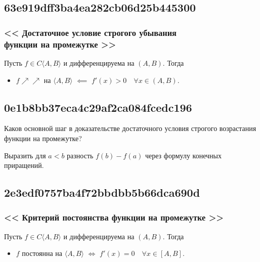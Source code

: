 \documentclass[11pt, a5paper]{article}
\newenvironment{note}[1]{\goodbreak\par\subsection{\hfill \color{lightgray}\tiny #1}}{}
\newenvironment{cloze}[2][\ldots]{\begin{leftbar}}{\end{leftbar}}
\newenvironment{icloze}[2][\ldots]{%
  \ignorespaces\text{\tiny \color{lightgray}\{#2} %
}{%
  \text{\tiny\color{lightgray}\}}\unskip%
}
\begin{document}
\begin{note}{63e919dff3ba4ea282cb06d25b445300}
    \subsubsection{<<\begin{icloze}{5}Достаточное условие строгого убывания \\ \phantom{<<}функции на промежутке\end{icloze}>>}
    Пусть \begin{icloze}{4}\( f \in C\langle A, B \rangle  \) и дифференцируема на \( (A, B) \).\end{icloze} Тогда
    \begin{itemize}
        \item {}\begin{icloze}{2}\( f \!\nearrow\!\!\nearrow \) на \( \langle A, B \rangle  \)\end{icloze}
            \begin{icloze}{3}\( \impliedby  \)\end{icloze}
            \begin{icloze}{1}\( f'(x) > 0 \quad \forall x \in (A, B) \).\end{icloze}
    \end{itemize}
\end{note}

\begin{note}{0e1b8bb37eca4c29af2ca084fcedc196}
    Каков основной шаг в доказательстве достаточного условия строгого возрастания функции на промежутке?

    \begin{cloze}{1}
        Выразить для \( a < b \) разность \( f(b) - f(a) \) через формулу конечных приращений.
    \end{cloze}
\end{note}

\begin{note}{2e3edf0757ba4f72bbdbb5b66dca690d}
    \subsubsection{<<\begin{icloze}{5}Критерий постоянства функции на промежутке\end{icloze}>>}
    Пусть \begin{icloze}{4}\( f \in C\langle A, B \rangle  \) и дифференцируема на \( (A, B) \).\end{icloze} Тогда
    \begin{itemize}
        \item {}\begin{icloze}{2}\( f \) постоянна на \( \langle A, B \rangle  \)\end{icloze}
            \begin{icloze}{3}\( \iff  \)\end{icloze}
            \begin{icloze}{1}\( f'(x) = 0 \quad \forall x \in [A, B] \).\end{icloze}
    \end{itemize}
\end{note}
\end{document}
